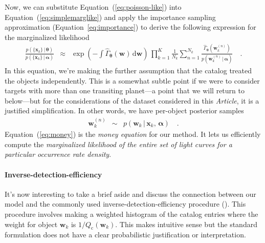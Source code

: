 \documentclass[12pt,preprint]{aastex}
\newcommand{\paper}{\textsl{Article}}
\newcommand{\Eq}[1]{Equation~(\ref{eq:#1})}
\newcommand{\eq}[1]{\Eq{#1}}
\newcommand{\eqalt}[1]{Equation~\ref{eq:#1}}
\newcommand{\eqlabel}[1]{\label{eq:#1}}
\newcommand{\dd}{\ensuremath{\,\mathrm{d}}}
\newcommand{\bvec}[1]{\ensuremath{\boldsymbol{#1}}}
\newcommand{\rate}{\ensuremath{\Gamma}}
\newcommand{\ratepar}{{\ensuremath{\theta}}}
\newcommand{\ratepars}{{\ensuremath{\bvec{\ratepar}}}}
\newcommand{\obs}[1]{\ensuremath{\hat{#1}}}
\newcommand{\completeness}{{\ensuremath{Q_\mathrm{c}}}}
\newcommand{\data}{{\ensuremath{\bvec{x}}}}
\newcommand{\entry}{{\ensuremath{\bvec{w}}}}
\newcommand{\interim}{{\ensuremath{\bvec{\alpha}}}}
\begin{document}
Now, we can substitute \eq{poisson-like} into \eq{simplemarglike} and apply
the importance sampling approximation (\eqalt{importance}) to derive the
following expression for the marginalized likelihood
\begin{eqnarray}\eqlabel{money}
\frac{p(\{\data_k\}\,|\,\ratepars)}{p(\{\data_k\}\,|\,\interim)} &\approx&
    \exp\left(-\int \obs{\rate}_\ratepars (\entry) \dd\entry\right) \,
    \prod_{k=1}^K
    \frac{1}{N_k} \sum_{n=1}^{N_k}
    \frac{\obs{\rate}_\ratepars (\entry_k^{(n)})}
         {p(\entry_k^{(n)}\,|\,\interim)} \quad.
\end{eqnarray}
In this equation, we're making the further assumption that the catalog treated
the objects independently.
This is a somewhat subtle point if we were to consider targets with more than
one transiting planet---a point that we will return to below---but for the
considerations of the dataset considered in this \paper, it is a justified
simplification.
In other words, we have per-object posterior samples
\begin{eqnarray}
\entry_k^{(n)} &\sim& p(\entry_k\,|\,\data_k,\,\interim) \quad.
\end{eqnarray}
\Eq{money} is the \emph{money equation} for our method.
It lets us efficiently compute the \emph{marginalized likelihood of the entire
set of light curves for a particular occurrence rate density}.

\paragraph{Inverse-detection-efficiency}
It's now interesting to take a brief aside and discuss the connection between
our model and the commonly used inverse-detection-efficiency procedure
(\citealt{howard,dressing,petigura}).
This procedure involves making a weighted histogram of the catalog entries
where the weight for object $\entry_k$ is $1/\completeness(\entry_k)$.
This makes intuitive sense but the standard formulation does not have a clear
probabilistic justification or interpretation.
\end{document}
